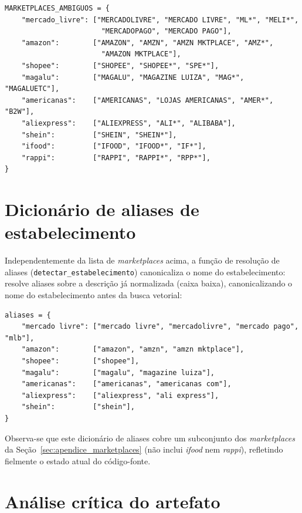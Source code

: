 \begin{apendicesenv}
{\footnotesize
\begin{verbatim}
MARKETPLACES_AMBIGUOS = {
    "mercado_livre": ["MERCADOLIVRE", "MERCADO LIVRE", "ML*", "MELI*",
                       "MERCADOPAGO", "MERCADO PAGO"],
    "amazon":        ["AMAZON", "AMZN", "AMZN MKTPLACE", "AMZ*",
                       "AMAZON MKTPLACE"],
    "shopee":        ["SHOPEE", "SHOPEE*", "SPE*"],
    "magalu":        ["MAGALU", "MAGAZINE LUIZA", "MAG*", "MAGALUETC"],
    "americanas":    ["AMERICANAS", "LOJAS AMERICANAS", "AMER*", "B2W"],
    "aliexpress":    ["ALIEXPRESS", "ALI*", "ALIBABA"],
    "shein":         ["SHEIN", "SHEIN*"],
    "ifood":         ["IFOOD", "IFOOD*", "IF*"],
    "rappi":         ["RAPPI", "RAPPI*", "RPP*"],
}
\end{verbatim}
}

\section{Dicionário de aliases de estabelecimento}

Independentemente da lista de \textit{marketplaces} acima, a função de resolução de aliases (\texttt{detectar\_\allowbreak estabelecimento}) canonicaliza o nome do estabelecimento: resolve aliases sobre a descrição já normalizada (caixa baixa), canonicalizando o nome do estabelecimento antes da busca vetorial:

{\footnotesize
\begin{verbatim}
aliases = {
    "mercado livre": ["mercado livre", "mercadolivre", "mercado pago", "mlb"],
    "amazon":        ["amazon", "amzn", "amzn mktplace"],
    "shopee":        ["shopee"],
    "magalu":        ["magalu", "magazine luiza"],
    "americanas":    ["americanas", "americanas com"],
    "aliexpress":    ["aliexpress", "ali express"],
    "shein":         ["shein"],
}
\end{verbatim}
}

Observa-se que este dicionário de aliases cobre um subconjunto dos \textit{marketplaces} da Seção~\ref{sec:apendice_marketplaces} (não inclui \textit{ifood} nem \textit{rappi}), refletindo fielmente o estado atual do código-fonte.

\section{Análise crítica do artefato}
\label{sec:apendice_normalizacao_critica}


\end{apendicesenv}
